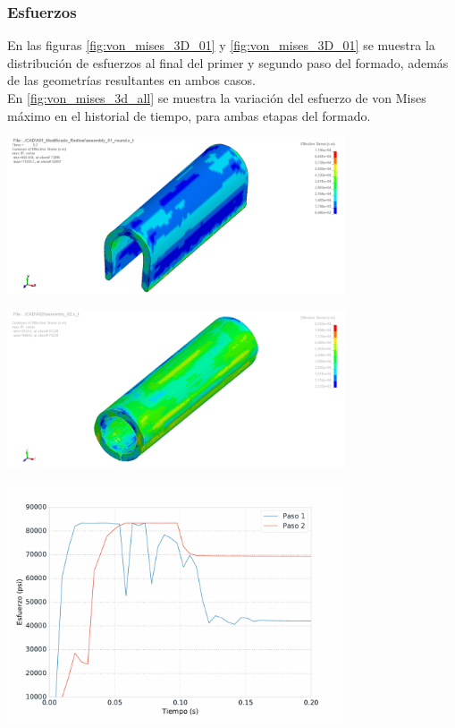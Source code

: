 \subsubsection{Esfuerzos}

En las figuras \ref{fig:von_mises_3D_01} y \ref{fig:von_mises_3D_01} se muestra la distribución 
de esfuerzos al final del primer y segundo paso del formado, además de las geometrías 
resultantes en ambos casos.\\

En \ref{fig:von_mises_3d_all} se muestra la variación del esfuerzo de von Mises máximo en 
el historial de tiempo, para ambas etapas del formado.

\begin{center}
\includegraphics[width=0.75\textwidth]{src/ch4/von_mises_3D_01.png}
\label{fig:von_mises_3D_01}
\end{center}

\begin{center}
\includegraphics[width=0.75\textwidth]{src/ch4/von_mises_3D_02.png}
\label{fig:von_mises_3D_02}
\end{center}

\begin{center}
\includegraphics[width=0.75\textwidth]{src/ch4/von_mises_3d_all.pdf}
\label{fig:von_mises_3d_all}
\end{center}

